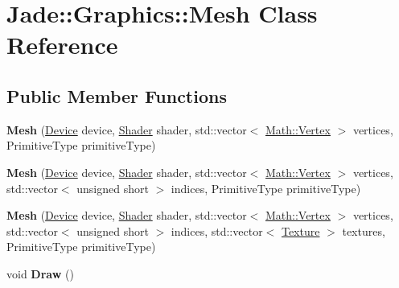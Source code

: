 \hypertarget{class_jade_1_1_graphics_1_1_mesh}{}\section{Jade\+:\+:Graphics\+:\+:Mesh Class Reference}
\label{class_jade_1_1_graphics_1_1_mesh}
\subsection*{Public Member Functions}
\begin{DoxyCompactItemize}
\item 
\hypertarget{class_jade_1_1_graphics_1_1_mesh_ab62fe95637e39647c0f3fd86ced57356}{}{\bfseries Mesh} (\hyperlink{class_jade_1_1_graphics_1_1_device}{Device} device, \hyperlink{class_jade_1_1_graphics_1_1_shader}{Shader} shader, std\+::vector$<$ \hyperlink{struct_jade_1_1_math_1_1_vertex}{Math\+::\+Vertex} $>$ vertices, Primitive\+Type primitive\+Type)\label{class_jade_1_1_graphics_1_1_mesh_ab62fe95637e39647c0f3fd86ced57356}

\item 
\hypertarget{class_jade_1_1_graphics_1_1_mesh_a3413c3b1c257a6bb410b8e109fbb31e7}{}{\bfseries Mesh} (\hyperlink{class_jade_1_1_graphics_1_1_device}{Device} device, \hyperlink{class_jade_1_1_graphics_1_1_shader}{Shader} shader, std\+::vector$<$ \hyperlink{struct_jade_1_1_math_1_1_vertex}{Math\+::\+Vertex} $>$ vertices, std\+::vector$<$ unsigned short $>$ indices, Primitive\+Type primitive\+Type)\label{class_jade_1_1_graphics_1_1_mesh_a3413c3b1c257a6bb410b8e109fbb31e7}

\item 
\hypertarget{class_jade_1_1_graphics_1_1_mesh_ac13dbbaa4bf29f3cd3b00205b8d4e809}{}{\bfseries Mesh} (\hyperlink{class_jade_1_1_graphics_1_1_device}{Device} device, \hyperlink{class_jade_1_1_graphics_1_1_shader}{Shader} shader, std\+::vector$<$ \hyperlink{struct_jade_1_1_math_1_1_vertex}{Math\+::\+Vertex} $>$ vertices, std\+::vector$<$ unsigned short $>$ indices, std\+::vector$<$ \hyperlink{class_jade_1_1_graphics_1_1_texture}{Texture} $>$ textures, Primitive\+Type primitive\+Type)\label{class_jade_1_1_graphics_1_1_mesh_ac13dbbaa4bf29f3cd3b00205b8d4e809}

\item 
\hypertarget{class_jade_1_1_graphics_1_1_mesh_accf8b32f688d9a6d257edeec7e422204}{}void {\bfseries Draw} ()\label{class_jade_1_1_graphics_1_1_mesh_accf8b32f688d9a6d257edeec7e422204}


\end{DoxyCompactItemize}
